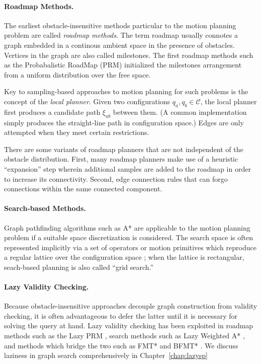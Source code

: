 \paragraph{Roadmap Methods.}

The earliest obstacle-insensitive methods particular to the motion
planning problem are called \emph{roadmap methods}.
The term roadmap usually connotes a graph embedded in a continous
ambient space in the presence of obstacles.
Vertices in the graph are also called milestones.
The first roadmap methods such as the
Probabalistic RoadMap (PRM) \citep{kavrakietal1996prm}
initialized the milestones arrangement
from a uniform distribution over the free space.

Key to sampling-based approaches
to motion planning for such problems
is the concept of the \emph{local planner}.
Given two configurations $q_a, q_b \in \mathcal{C}$,
the local planner first produces a candidate path $\xi_{ab}$ between
them.
(A common implementation simply produces the straight-line path
in configuration space.)
Edges are only attempted when they meet certain restrictions.

There are some variants of roadmap planners that are not independent
of the obstacle distribution.
First,
many roadmap planners make use of a heuristic ``expansion'' step
wherein additional samples are added to the roadmap
in order to increase its connectivity.
Second,
edge connection rules that can forgo connections within
the same connected component.


\paragraph{Search-based Methods.}
Graph pathfinding algorithms such as A* \citep{hart1968astar}
are applicable to the motion planning problem if a suitable
space discretization is considered.
The search space is often represented implicitly via a set of
operators or motion primitives
which reproduce a regular lattice over the configuration space
\citep{pivtoraiko2005statelattice};
when the lattice is rectangular,
seach-based planning is also called ``grid search.''

\paragraph{Lazy Validity Checking.}
Because obstacle-insensitive approaches decouple graph construction
from validity checking,
it is often advantageous to defer the latter until it is
necessary for solving the query at hand.
Lazy validity checking has been exploited
in roadmap methods such as the Lazy PRM
\citep{bohlin2000lazyprm, hauser2015lazy},
search methods such as Lazy Weighted A* \citep{cohen2014narms},
and methods which bridge the two such as FMT* \citep{janson2015fmtstar}
and BFMT* \citep{starek2015bfmtstar}.
We discuss laziness in graph search comprehensively
in Chapter~\ref{chap:lazysp}

